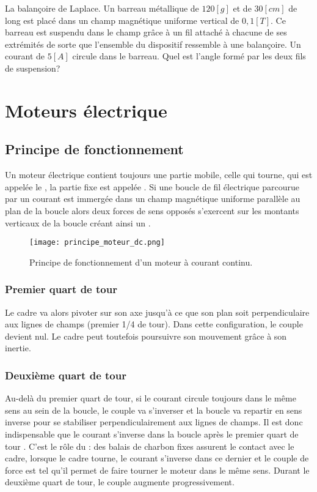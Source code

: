 \begin{exercise}
    La balançoire de Laplace.
    Un barreau métallique de \(120[g]\) et de \(30[cm]\) de long est placé dans un champ magnétique uniforme vertical de \(0,1[T]\).
    Ce barreau est suspendu dans le champ grâce à un fil attaché à chacune de ses extrémités de sorte que l'ensemble du dispositif ressemble à une balançoire. Un courant de \(5[A]\) circule dans le barreau. Quel est l'angle formé par les deux fils de suspension?
\end{exercise}

\newpage

\section{Moteurs électrique}
\subsection{Principe de fonctionnement}
Un moteur électrique contient toujours une partie mobile, celle qui tourne, qui est appelée le , la partie fixe est appelée .
Si une boucle de fil électrique parcourue par un courant est immergée dans un champ magnétique uniforme parallèle au plan de la boucle alors deux forces de sens opposés s'exercent sur les montants verticaux de la boucle créant ainsi un .

\begin{figure}[h]
    \centering
    \texttt{[image: principe\_moteur\_dc.png]}
    \caption{Principe de fonctionnement d'un moteur à courant continu.}
    \label{principe_moteur_dc}
\end{figure}

\subsubsection*{Premier quart de tour}
Le cadre va alors pivoter sur son axe jusqu'à ce que son plan soit perpendiculaire aux lignes de champs (premier 1/4 de tour). Dans cette configuration, le couple devient nul. Le cadre peut toutefois poursuivre son mouvement grâce à son inertie.

\subsubsection*{Deuxième quart de tour}
Au-delà du premier quart de tour, si le courant circule toujours dans le même sens au sein de la boucle, le couple va s'inverser et la boucle va repartir en sens inverse pour se stabiliser perpendiculairement aux lignes de champs. Il est donc indispensable que le courant s'inverse dans la boucle après le premier quart de tour . C'est le rôle du  : des balais de charbon fixes assurent le contact avec le cadre, lorsque le cadre tourne, le courant s'inverse dans ce dernier et le couple de force est tel qu'il permet de faire tourner le moteur dans le même sens.
Durant le deuxième quart de tour, le couple augmente progressivement.

